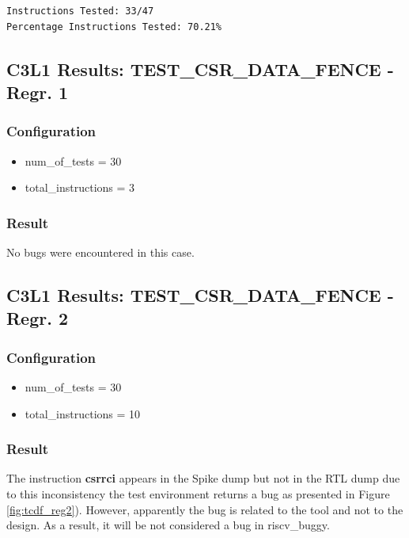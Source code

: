 \begin{verbatim}
Instructions Tested: 33/47
Percentage Instructions Tested: 70.21%
\end{verbatim}

\subsection{C3L1 Results: TEST\_CSR\_DATA\_FENCE - Regr. 1}

\subsubsection{Configuration}

\begin{itemize}
    \item num\_of\_tests = 30
    \item total\_instructions = 3
\end{itemize}

\subsubsection{Result}

No bugs were encountered in this case.

\subsection{C3L1 Results: TEST\_CSR\_DATA\_FENCE - Regr. 2}

\subsubsection{Configuration}

\begin{itemize}
    \item num\_of\_tests = 30
    \item total\_instructions = 10
\end{itemize}

\subsubsection{Result}
The instruction \textbf{csrrci} appears in the Spike dump but not in the RTL dump due to this inconsistency the test environment returns a bug as presented in Figure \ref{fig:tcdf_reg2}). However, apparently the bug is related to the tool and not to the design. As a result, it will be not considered a bug in riscv\_buggy.

